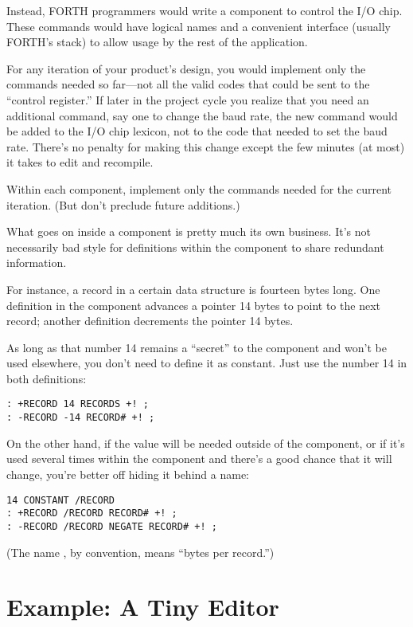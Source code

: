 Instead, FORTH programmers would write a component to control the I/O
chip. These commands would have logical names and a convenient
interface (usually FORTH's stack) to allow usage by the rest of the
application.

For any iteration of your product's design, you would implement only
the commands needed so far---not all the valid codes that could be
sent to the ``control register.'' If later in the project cycle you
realize that you need an additional command, say one to change the
baud rate, the new command would be added to the I/O chip lexicon, not
to the code that needed to set the baud rate. There's no penalty for
making this change except the few minutes (at most) it takes to edit
and recompile.

\begin{tip}
Within each component, implement only the commands needed for the
current iteration. (But don't preclude future additions.)
\end{tip}

What goes on inside a component is pretty much its own business. It's
not necessarily bad style for definitions within the component to share
redundant information.

For instance, a record in a certain data structure is fourteen bytes
long. One definition in the component advances a pointer 14 bytes to
point to the next record; another definition decrements the pointer 14
bytes.

As long as that number 14 remains a ``secret'' to the component and
won't be used elsewhere, you don't need to define it as constant. Just use
the number 14 in both definitions:

\begin{verbatim}
: +RECORD 14 RECORDS +! ;
: -RECORD -14 RECORD# +! ;
\end{verbatim}

On the other hand, if the value will be needed outside of the component,
or if it's used several times within the component and there's a good
chance that it will change, you're better off hiding it behind a name:

\begin{verbatim}
14 CONSTANT /RECORD
: +RECORD /RECORD RECORD# +! ;
: -RECORD /RECORD NEGATE RECORD# +! ;
\end{verbatim}

(The name , by convention, means ``bytes per record.'')

\pagebreak\section{Example: A Tiny Editor}

